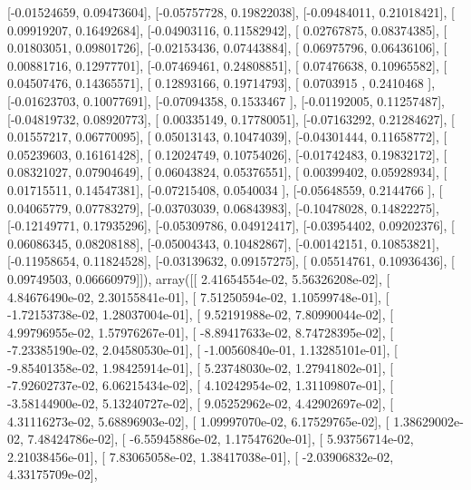 \documentclass{article}
\begin{document}
       [-0.01524659,  0.09473604],
       [-0.05757728,  0.19822038],
       [-0.09484011,  0.21018421],
       [ 0.09919207,  0.16492684],
       [-0.04903116,  0.11582942],
       [ 0.02767875,  0.08374385],
       [ 0.01803051,  0.09801726],
       [-0.02153436,  0.07443884],
       [ 0.06975796,  0.06436106],
       [ 0.00881716,  0.12977701],
       [-0.07469461,  0.24808851],
       [ 0.07476638,  0.10965582],
       [ 0.04507476,  0.14365571],
       [ 0.12893166,  0.19714793],
       [ 0.0703915 ,  0.2410468 ],
       [-0.01623703,  0.10077691],
       [-0.07094358,  0.1533467 ],
       [-0.01192005,  0.11257487],
       [-0.04819732,  0.08920773],
       [ 0.00335149,  0.17780051],
       [-0.07163292,  0.21284627],
       [ 0.01557217,  0.06770095],
       [ 0.05013143,  0.10474039],
       [-0.04301444,  0.11658772],
       [ 0.05239603,  0.16161428],
       [ 0.12024749,  0.10754026],
       [-0.01742483,  0.19832172],
       [ 0.08321027,  0.07904649],
       [ 0.06043824,  0.05376551],
       [ 0.00399402,  0.05928934],
       [ 0.01715511,  0.14547381],
       [-0.07215408,  0.0540034 ],
       [-0.05648559,  0.2144766 ],
       [ 0.04065779,  0.07783279],
       [-0.03703039,  0.06843983],
       [-0.10478028,  0.14822275],
       [-0.12149771,  0.17935296],
       [-0.05309786,  0.04912417],
       [-0.03954402,  0.09202376],
       [ 0.06086345,  0.08208188],
       [-0.05004343,  0.10482867],
       [-0.00142151,  0.10853821],
       [-0.11958654,  0.11824528],
       [-0.03139632,  0.09157275],
       [ 0.05514761,  0.10936436],
       [ 0.09749503,  0.06660979]]), array([[  2.41654554e-02,   5.56326208e-02],
       [  4.84676490e-02,   2.30155841e-01],
       [  7.51250594e-02,   1.10599748e-01],
       [ -1.72153738e-02,   1.28037004e-01],
       [  9.52191988e-02,   7.80990044e-02],
       [  4.99796955e-02,   1.57976267e-01],
       [ -8.89417633e-02,   8.74728395e-02],
       [ -7.23385190e-02,   2.04580530e-01],
       [ -1.00560840e-01,   1.13285101e-01],
       [ -9.85401358e-02,   1.98425914e-01],
       [  5.23748030e-02,   1.27941802e-01],
       [ -7.92602737e-02,   6.06215434e-02],
       [  4.10242954e-02,   1.31109807e-01],
       [ -3.58144900e-02,   5.13240727e-02],
       [  9.05252962e-02,   4.42902697e-02],
       [  4.31116273e-02,   5.68896903e-02],
       [  1.09997070e-02,   6.17529765e-02],
       [  1.38629002e-02,   7.48424786e-02],
       [ -6.55945886e-02,   1.17547620e-01],
       [  5.93756714e-02,   2.21038456e-01],
       [  7.83065058e-02,   1.38417038e-01],
       [ -2.03906832e-02,   4.33175709e-02],
\end{document}
